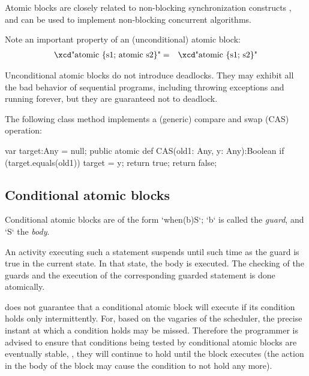 Atomic blocks are closely related to non-blocking synchronization
constructs \cite{herlihy91waitfree}, and can be used to implement 
non-blocking concurrent algorithms.

Note an important property of an (unconditional) atomic block:
\begin{eqnarray}
\mbox{\xcd"atomic \{s1; atomic s2\}"} &=& \mbox{\xcd"atomic \{s1; s2\}"}
\end{eqnarray}

Unconditional atomic blocks do not introduce deadlocks.    They may
exhibit all the bad behavior of sequential programs, including
throwing exceptions and running forever, but they are guaranteed not
to deadlock. 

\begin{ex}
The following class method implements a (generic) compare and swap (CAS) operation:


\begin{xten}
var target:Any = null;
public atomic def CAS(old1: Any, y: Any):Boolean {
   if (target.equals(old1)) {
     target = y;
     return true;
   }
   return false;
}
\end{xten}
\end{ex}


\subsection{Conditional atomic blocks}
Conditional atomic blocks are of the form \xcd`when(b)S`; 
\xcd`b` is called the {\em guard}, and \xcd`S` the {\em body}.

An activity executing such a statement suspends until such time as the  guard
is true in the current state. In that state, the 
body is executed. 
The checking of the guards and the execution of the corresponding
guarded statement is done atomically. 

\Xten{} does not guarantee that a conditional atomic block
will execute if its condition holds only intermittently. For, based on
the vagaries of the scheduler, the precise instant at which a
condition holds may be missed. Therefore the programmer is advised to
ensure that conditions being tested by conditional atomic blocks are
eventually stable, \ie, they will continue to hold until the block
executes (the action in the body of the block may cause the condition
to not hold any more).

